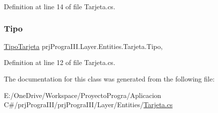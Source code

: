Definition at line 14 of file Tarjeta.\+cs.

\hypertarget{classprj_progra_i_i_i_1_1_layer_1_1_entities_1_1_tarjeta_a4f5e28b97fd18d6d1e67af6a3f043eb3}{}\label{classprj_progra_i_i_i_1_1_layer_1_1_entities_1_1_tarjeta_a4f5e28b97fd18d6d1e67af6a3f043eb3} 
\subsubsection{\texorpdfstring{Tipo}{Tipo}}
{\footnotesize\ttfamily \hyperlink{_tipo_tarjeta_8cs_a7b9bee44d937449fa100c92d7402dcd9}{Tipo\+Tarjeta} prj\+Progra\+I\+I\+I.\+Layer.\+Entities.\+Tarjeta.\+Tipo\hspace{0.3cm}{\ttfamily [get]}, {\ttfamily [set]}}



Definition at line 12 of file Tarjeta.\+cs.



The documentation for this class was generated from the following file\+:\begin{DoxyCompactItemize}
\item 
E\+:/\+One\+Drive/\+Workspace/\+Proyecto\+Progra/\+Aplicacion C\#/prj\+Progra\+I\+I\+I/prj\+Progra\+I\+I\+I/\+Layer/\+Entities/\hyperlink{_tarjeta_8cs}{Tarjeta.\+cs}\end{DoxyCompactItemize}
